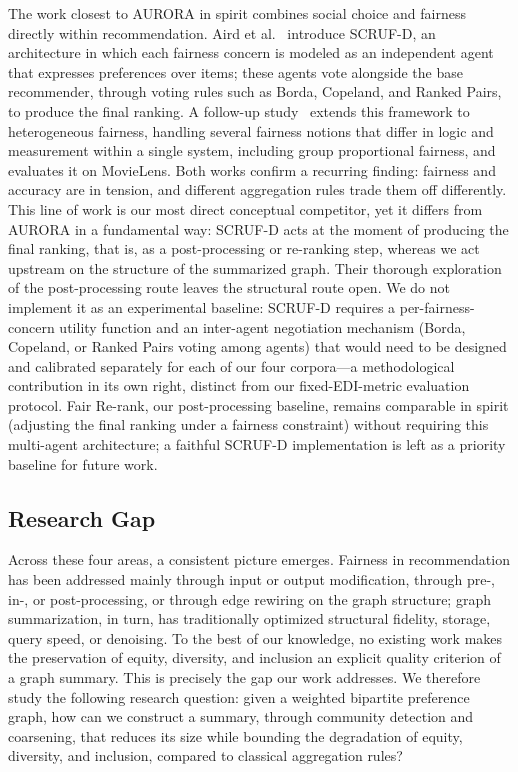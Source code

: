 \documentclass[a4paper,fleqn]{cas-dc}
\begin{document}
The work closest to AURORA in spirit combines social choice and fairness
directly within recommendation. Aird et al.~\citeyearpar{aird_exploring_2023}
introduce SCRUF-D, an architecture in which each fairness concern is modeled
as an independent agent that expresses preferences over items; these agents
vote alongside the base recommender, through voting rules such as Borda,
Copeland, and Ranked Pairs, to produce the final ranking. A follow-up
study~\cite{aird_social_2024} extends this framework to heterogeneous
fairness, handling several fairness notions that differ in logic and
measurement within a single system, including group proportional fairness,
and evaluates it on MovieLens. Both works confirm a recurring finding:
fairness and accuracy are in tension, and different aggregation rules trade
them off differently. This line of work is our most direct conceptual
competitor, yet it differs from AURORA in a fundamental way: SCRUF-D acts at the
moment of producing the final ranking, that is, as a post-processing or
re-ranking step, whereas we act upstream on the structure of the summarized
graph. Their thorough exploration of the post-processing route leaves the
structural route open. We do not implement it as an experimental baseline:
SCRUF-D requires a per-fairness-concern utility function and an inter-agent
negotiation mechanism (Borda, Copeland, or Ranked Pairs voting among agents)
that would need to be designed and calibrated separately for each of our four
corpora—a methodological contribution in its own right, distinct from our
fixed-EDI-metric evaluation protocol. Fair Re-rank, our post-processing
baseline, remains comparable in spirit (adjusting the final ranking under a
fairness constraint) without requiring this multi-agent architecture; a
faithful SCRUF-D implementation is left as a priority baseline for future
work.

\subsection{Research Gap}

Across these four areas, a consistent picture emerges. Fairness in
recommendation has been addressed mainly through input or output modification,
through pre-, in-, or post-processing, or through edge rewiring on the graph
structure; graph summarization, in turn, has traditionally optimized
structural fidelity, storage, query speed, or denoising. To the best of our
knowledge, no existing work makes the preservation of equity, diversity, and
inclusion an explicit quality criterion of a graph summary. This is precisely
the gap our work addresses. We therefore study the following research
question: given a weighted bipartite preference graph, how can we construct a
summary, through community detection and coarsening, that reduces its size
while bounding the degradation of equity, diversity, and inclusion, compared
to classical aggregation rules?
\end{document}
